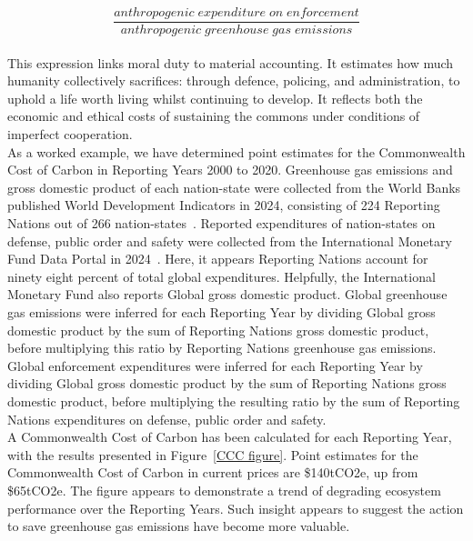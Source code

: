 \documentclass[12pt, oneside]{article}   	%
\begin{document}
\begin{equation}
	\frac{anthropogenic\; expenditure\; on\; enforcement}{anthropogenic\; greenhouse\; gas\; emissions}
\end{equation}\\

This expression links moral duty to material accounting.
It estimates how much humanity collectively sacrifices: through defence, policing, and administration, to uphold a life worth living whilst continuing to develop.
It reflects both the economic and ethical costs of sustaining the commons under conditions of imperfect cooperation.\\

As a worked example, we have determined point estimates for the Commonwealth Cost of Carbon in Reporting Years 2000 to 2020.
Greenhouse gas emissions and gross domestic product of each nation-state were collected from the World Banks published World Development Indicators in 2024, consisting of 224 Reporting Nations out of 266 nation-states~\cite{wbank}.
Reported expenditures of nation-states on defense, public order and safety were collected from the International Monetary Fund Data Portal in 2024~\cite{imf}.
Here, it appears Reporting Nations account for ninety eight percent of total global expenditures.
Helpfully, the International Monetary Fund also reports Global gross domestic product.
Global greenhouse gas emissions were inferred for each Reporting Year by dividing Global gross domestic product by the sum of Reporting Nations gross domestic product, before multiplying this ratio by Reporting Nations greenhouse gas emissions.
Global enforcement expenditures were inferred for each Reporting Year by dividing Global gross domestic product by the sum of Reporting Nations gross domestic product, before multiplying the resulting ratio by the sum of Reporting Nations expenditures on defense, public order and safety.\\
A Commonwealth Cost of Carbon has been calculated for each Reporting Year, with the results presented in Figure~\ref{CCC figure}.
Point estimates for the Commonwealth Cost of Carbon in current prices are \$140tCO2e, up from \$65tCO2e.
The figure appears to demonstrate a trend of degrading ecosystem performance over the Reporting Years.
Such insight appears to suggest the action to save greenhouse gas emissions have become more valuable.\\
\end{document}
